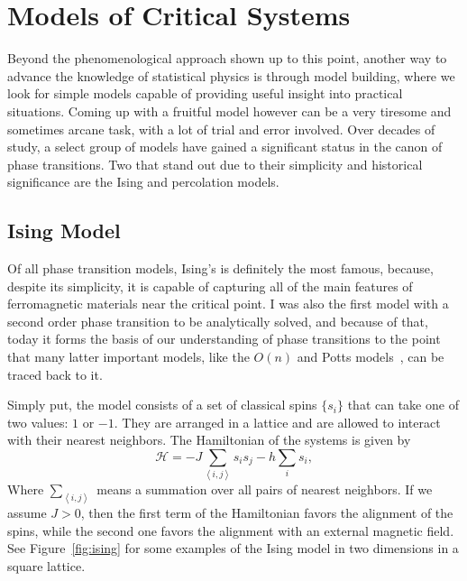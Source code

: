 \section{Models of Critical Systems}
\label{sec:models}

Beyond the phenomenological approach shown up to this point, another way to
advance the knowledge of statistical physics is through model building, where
we look for simple models capable of providing useful insight into practical
situations. Coming up with a fruitful model however can be a very tiresome and
sometimes arcane task, with a lot of trial and error involved. Over decades of
study, a select group of models have gained a significant status in the canon
of phase transitions. Two that stand out due to their simplicity and historical
significance are the Ising and percolation models.


\subsection{Ising Model}
\label{sec:ising}

Of all phase transition models, Ising's is definitely the most famous, because,
despite its simplicity, it is capable of capturing all of the main features of
ferromagnetic materials near the critical point. I was also the first model
with a second order phase transition to be analytically solved, and because of
that, today it forms the basis of our understanding of phase transitions to
the point that many latter important models, like the $O(n)$ and Potts
models~\cite{Wu1982}, can be traced back to it.

Simply put, the model consists of a set of classical spins $\{s_i\}$ that can
take one of two values: $1$ or $-1$. They are arranged in a lattice and are
allowed to interact with their nearest neighbors. The Hamiltonian of the
systems is given by
\begin{equation}
    \mathcal{H}=
    -J\sum_{\left\langle i,j\right\rangle }s_{i}s_{j}
    -h\sum_{i}s_{i},
\end{equation}
Where $\sum_{\left\langle i,j\right\rangle}$ means a summation over all pairs
of nearest neighbors. If we assume $J>0$, then the first term of the
Hamiltonian favors the alignment of the spins, while the second one favors the
alignment with an external magnetic field. See Figure~\ref{fig:ising} for some
examples of the Ising model in two dimensions in a square lattice.


